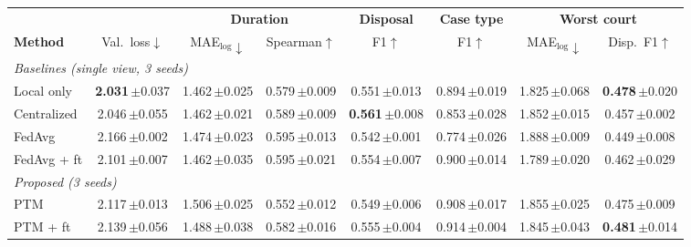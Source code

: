 \begin{table}[H]
\centering
\footnotesize
\setlength{\tabcolsep}{3pt}
\renewcommand{\arraystretch}{1.08}
\begin{tabular}{l c cc c c cc}
\toprule
& & \multicolumn{2}{c}{\textbf{Duration}} & \textbf{Disposal} & \textbf{Case type} & \multicolumn{2}{c}{\textbf{Worst court}} \\
\cmidrule(lr){3-4}\cmidrule(lr){5-5}\cmidrule(lr){6-6}\cmidrule(lr){7-8}
\textbf{Method} & Val.\ loss$\downarrow$ & MAE$_{\log}\downarrow$ & Spearman$\uparrow$ & F1$\uparrow$ & F1$\uparrow$ & MAE$_{\log}\downarrow$ & Disp.\ F1$\uparrow$ \\
\midrule
\multicolumn{8}{l}{\textit{Baselines (single view, 3 seeds)}} \\
Local only & \textbf{2.031}\,{\scriptsize$\pm$0.037} & 1.462\,{\scriptsize$\pm$0.025} & 0.579\,{\scriptsize$\pm$0.009} & 0.551\,{\scriptsize$\pm$0.013} & 0.894\,{\scriptsize$\pm$0.019} & 1.825\,{\scriptsize$\pm$0.068} & \textbf{0.478}\,{\scriptsize$\pm$0.020} \\
Centralized & 2.046\,{\scriptsize$\pm$0.055} & 1.462\,{\scriptsize$\pm$0.021} & 0.589\,{\scriptsize$\pm$0.009} & \textbf{0.561}\,{\scriptsize$\pm$0.008} & 0.853\,{\scriptsize$\pm$0.028} & 1.852\,{\scriptsize$\pm$0.015} & 0.457\,{\scriptsize$\pm$0.002} \\
FedAvg & 2.166\,{\scriptsize$\pm$0.002} & 1.474\,{\scriptsize$\pm$0.023} & 0.595\,{\scriptsize$\pm$0.013} & 0.542\,{\scriptsize$\pm$0.001} & 0.774\,{\scriptsize$\pm$0.026} & 1.888\,{\scriptsize$\pm$0.009} & 0.449\,{\scriptsize$\pm$0.008} \\
FedAvg + ft & 2.101\,{\scriptsize$\pm$0.007} & 1.462\,{\scriptsize$\pm$0.035} & 0.595\,{\scriptsize$\pm$0.021} & 0.554\,{\scriptsize$\pm$0.007} & 0.900\,{\scriptsize$\pm$0.014} & 1.789\,{\scriptsize$\pm$0.020} & 0.462\,{\scriptsize$\pm$0.029} \\
\midrule
\multicolumn{8}{l}{\textit{Proposed (3 seeds)}} \\
PTM & 2.117\,{\scriptsize$\pm$0.013} & 1.506\,{\scriptsize$\pm$0.025} & 0.552\,{\scriptsize$\pm$0.012} & 0.549\,{\scriptsize$\pm$0.006} & 0.908\,{\scriptsize$\pm$0.017} & 1.855\,{\scriptsize$\pm$0.025} & 0.475\,{\scriptsize$\pm$0.009} \\
PTM + ft & 2.139\,{\scriptsize$\pm$0.056} & 1.488\,{\scriptsize$\pm$0.038} & 0.582\,{\scriptsize$\pm$0.016} & 0.555\,{\scriptsize$\pm$0.004} & 0.914\,{\scriptsize$\pm$0.004} & 1.845\,{\scriptsize$\pm$0.043} & \textbf{0.481}\,{\scriptsize$\pm$0.014} \\

\end{tabular}
\end{table}
